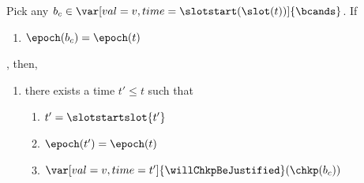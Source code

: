 \documentclass{article}
\begin{document}







\begin{lemma}\label{lem:no-curr-epochconflict-chkp-is-justified}
    Pick any $b_c \in  \var[val=v,time=\slotstart(\slot(t))]{\bcands}$.
    If
    \begin{enumerate}
        \item $\epoch(b_c) = \epoch(t)$
    \end{enumerate},
    then,\
    \begin{enumerate}
        \item there exists a time $t' \leq t$ such that
        \begin{enumerate}
            \item $t' = \slotstartslot{t'}$
            \item $\epoch(t') = \epoch(t)$
            \item $\var[val=v,time=t']{\willChkpBeJustified}(\chkp(b_c))$
        \end{enumerate}
    \end{enumerate}
\end{lemma}
\end{document}
